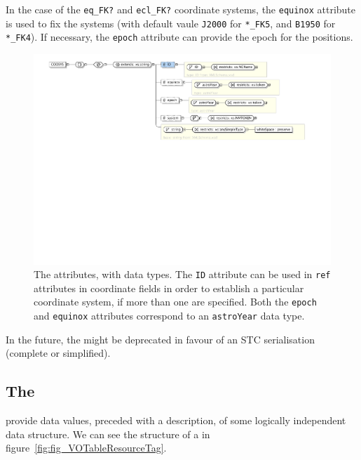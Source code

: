 In the case of the \texttt{eq\_FK?} and \texttt{ecl\_FK?} coordinate
systems, the \texttt{equinox} attribute is used to fix the systems
(with default vaule \texttt{J2000} for \texttt{*\_FK5}, and
\texttt{B1950} for \texttt{*\_FK4}). If necessary, the \texttt{epoch}
attribute can provide the epoch for the positions.

\begin{figure}[tbp]
	\centering
		\includegraphics[width=\columnwidth]{fig/VOTableCoosysTag.pdf}
	\caption[Attributes of the ]{
		The  attributes, with data types.
		The \texttt{ID} attribute can be used in \texttt{ref} attributes
		in coordinate fields in order to establish a particular
		coordinate system, if more than one  are
		specified. Both the \texttt{epoch} and \texttt{equinox}
		attributes correspond to an \texttt{astroYear} data type.
	}
	\label{fig:fig_VOTableCoosysTag}
\end{figure}

In the future, the  might be deprecated in favour of an
STC\cite{2007stc..ivoa.....R} serialisation (complete or simplified).


\subsection{The } %
\label{sub:the_resource_tag}

 provide data values, preceded with a description, of
some logically independent data structure. We can see the structure of
a  in figure~\ref{fig:fig_VOTableResourceTag}.

